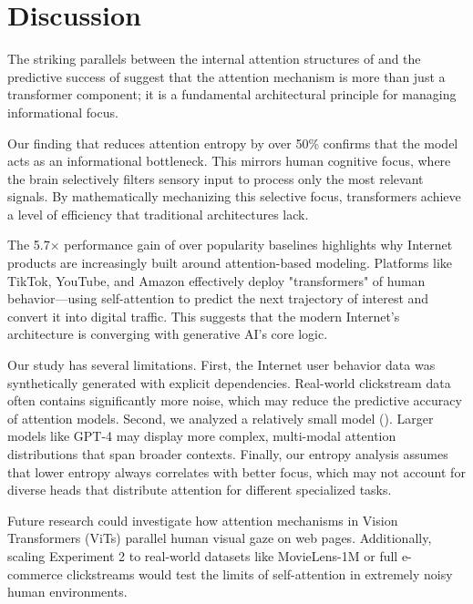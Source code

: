 \section{Discussion}
\label{sec:discussion}

The striking parallels between the internal attention structures of \gpttwo and the predictive success of \sasrec suggest that the attention mechanism is more than just a transformer component; it is a fundamental architectural principle for managing informational focus.

 Our finding that \gpttwo reduces attention entropy by over 50\% confirms that the model acts as an informational bottleneck. This mirrors human cognitive focus, where the brain selectively filters sensory input to process only the most relevant signals. By mathematically mechanizing this selective focus, transformers achieve a level of efficiency that traditional architectures lack.

 The 5.7$\times$ performance gain of \sasrec over popularity baselines highlights why Internet products are increasingly built around attention-based modeling. Platforms like TikTok, YouTube, and Amazon effectively deploy "transformers" of human behavior—using self-attention to predict the next trajectory of interest and convert it into digital traffic. This suggests that the modern Internet's architecture is converging with generative AI's core logic.

 Our study has several limitations. First, the Internet user behavior data was synthetically generated with explicit dependencies. Real-world clickstream data often contains significantly more noise, which may reduce the predictive accuracy of attention models. Second, we analyzed a relatively small model (\gpttwo). Larger models like GPT-4 may display more complex, multi-modal attention distributions that span broader contexts. Finally, our entropy analysis assumes that lower entropy always correlates with better focus, which may not account for diverse heads that distribute attention for different specialized tasks.

 Future research could investigate how attention mechanisms in Vision Transformers (ViTs) parallel human visual gaze on web pages. Additionally, scaling Experiment 2 to real-world datasets like MovieLens-1M or full e-commerce clickstreams would test the limits of self-attention in extremely noisy human environments.
